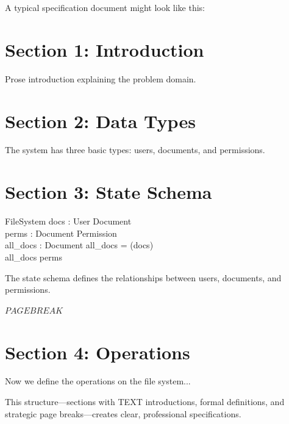 \documentclass[a4paper,10pt,fleqn]{article}
\begin{document}
\noindent A typical specification document might look like this:

\bigskip

\section*{Section 1: Introduction}

\noindent Prose introduction explaining the problem domain.

\bigskip

\section*{Section 2: Data Types}

\begin{zed}
\end{zed}

\noindent The system has three basic types: users, documents, and permissions.

\bigskip

\section*{Section 3: State Schema}

\begin{schema}{FileSystem}
docs : User \pfun \power Document \\
perms : Document \pfun \power Permission \\
all\_docs : \power Document
\where
all\_docs = \bigcup (\ran docs) \\
all\_docs \subseteq \dom perms
\end{schema}

\noindent The state schema defines the relationships between users, documents, and permissions.

\bigskip

\noindent
$PAGEBREAK$


\section*{Section 4: Operations}

\noindent Now we define the operations on the file system...

\bigskip

\noindent This structure—sections with TEXT introductions, formal definitions, and strategic page breaks—creates clear, professional specifications.

\bigskip
\end{document}
